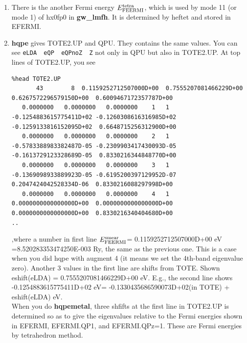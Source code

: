 \documentclass[a4paper,10pt,epsf,fleqn]{article}
\newcommand{\exe}[1]{{\bf #1}}
\newcommand{\io}[1]{{\sf  #1}}
\begin{document}
{\begin{enumerate}
Here $E_{\rm FEERMI}^{\rm smear}$=8.520283353474250E-003. 
From the second lines, they are LDA eigenvalues and QP energies 
(Z included and Z=1); they are relative to the $E_{\rm FEERMI}^{\rm smear}$.\\
-13.18843159 eV - $E_{\rm FEERMI}^{\rm smear}$(which should be translated into in eV)  
= -0.1330435686590073D+02 eV.
Here -13.18843159 is the value in \io{VXCFP.chk} shown above.


\item
There is the another Fermi energy $E_{\rm FEERMI}^{\rm tetra}$, 
which is used by mode 11 (or mode 1) of hx0fp0 in {\bf gw\_lmfh}.
It is determined by heftet and stored in \io{EFERMI}.

\item
\exe{hqpe} gives \io{TOTE2.UP} and \io{QPU}. 
They contains the same values. You can see  
\verb#eLDA  eQP  eQPnoZ  Z# not only in \io{QPU} but also in \io{TOTE2.UP}.
At top lines of \io{TOTE2.UP}, you see  
{\baselineskip=3mm \small
\begin{verbatim}
%head TOTE2.UP
       43        8  0.1159252712507000D+00  0.7555207081466229D+00  0.6267572296579150D+00  0.6009467172357787D+00
   0.0000000   0.0000000   0.0000000    1   1  -0.1254883615775411D+02 -0.1260308616316985D+02 -0.1259133816152095D+02  0.6648715256312900D+00
   0.0000000   0.0000000   0.0000000    2   1  -0.5783388983382487D-05 -0.2309903417430093D-05 -0.1613729123328689D-05  0.8330216344848770D+00
   0.0000000   0.0000000   0.0000000    3   1  -0.1369098933889923D-05 -0.6195200397129952D-07  0.2047424042528334D-06  0.8330216088297998D+00
   0.0000000   0.0000000   0.0000000    4   1   0.0000000000000000D+00  0.0000000000000000D+00  0.0000000000000000D+00  0.8330216340404680D+00
..
\end{verbatim}}
,where a number in first line $E_{\rm FEERMI}^{\rm smear}$= 
0.1159252712507000D+00 eV =8.520283353474250E-003 Ry,
the same as the previous one.
This is a case when you did hqpe with augment 4 
(it means we set the 4th-band eigenvalue zero).
Another 3 values in the first line are shifts from \io{TOTE}.
Shown eshift(eLDA) = 0.7555207081466229D+00 eV.
E.g., the second line shows\\
-0.1254883615775411D+02 eV= -0.1330435686590073D+02(in TOTE) + eshift(eLDA) eV.\\

When you do \exe{hqpemetal}, three shfifts at the first line in \io{TOTE2.UP}
is determined so as to give the eigenvalues relative to the Fermi
energies shown in \io{EFERMI}, \io{EFERMI.QP1}, and \io{EFERMI.QPz=1}. 
These are Fermi energies by tetrahedron method.


\end{enumerate}}
\end{document}

